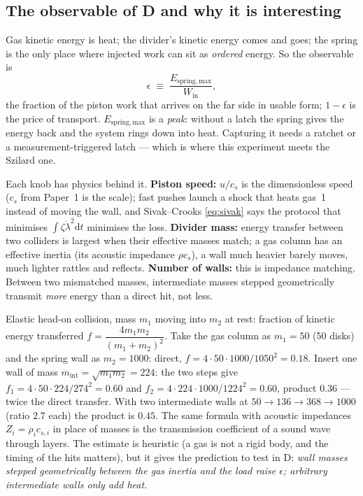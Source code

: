 \documentclass[11pt,a4paper]{article}
\newcommand{\dd}{\mathrm{d}}
\begin{document}
\subsection{The observable of D and why it is interesting}
Gas kinetic energy is heat; the divider's kinetic energy comes and goes; the spring is the only place where injected work can sit as \emph{ordered} energy. So the observable is
\begin{equation}
\epsilon \;\equiv\; \frac{E_{\mathrm{spring,max}}}{W_{\mathrm{in}}},
\end{equation}
the fraction of the piston work that arrives on the far side in usable form; $1-\epsilon$ is the price of transport. $E_{\mathrm{spring,max}}$ is a \emph{peak}: without a latch the spring gives the energy back and the system rings down into heat. Capturing it needs a ratchet or a measurement-triggered latch --- which is where this experiment meets the Szilard one.

Each knob has physics behind it. \textbf{Piston speed:} $u/c_s$ is the dimensionless speed ($c_s$ from Paper~1 is the scale); fast pushes launch a shock that heats gas~1 instead of moving the wall, and Sivak--Crooks \eqref{eq:sivak} says the protocol that minimises $\int\zeta\dot\lambda^2\dd t$ minimises the loss. \textbf{Divider mass:} energy transfer between two colliders is largest when their effective masses match; a gas column has an effective inertia (its acoustic impedance $\rho c_s$), a wall much heavier barely moves, much lighter rattles and reflects. \textbf{Number of walls:} this is impedance matching. Between two mismatched masses, intermediate masses stepped geometrically transmit \emph{more} energy than a direct hit, not less.

\begin{worked}
Elastic head-on collision, mass $m_1$ moving into $m_2$ at rest: fraction of kinetic energy transferred $f = \dfrac{4m_1m_2}{(m_1+m_2)^2}$. Take the gas column as $m_1 = 50$ (50 disks) and the spring wall as $m_2 = 1000$: direct, $f = 4\cdot50\cdot1000/1050^2 = 0.18$. Insert one wall of mass $m_{\mathrm{int}} = \sqrt{m_1m_2} = 224$: the two steps give $f_1 = 4\cdot50\cdot224/274^2 = 0.60$ and $f_2 = 4\cdot224\cdot1000/1224^2 = 0.60$, product $0.36$ --- twice the direct transfer. With two intermediate walls at $50\to136\to368\to1000$ (ratio $2.7$ each) the product is $0.45$. The same formula with acoustic impedances $Z_i = \rho_i c_{s,i}$ in place of masses is the transmission coefficient of a sound wave through layers. The estimate is heuristic (a gas is not a rigid body, and the timing of the hits matters), but it gives the prediction to test in D: \emph{wall masses stepped geometrically between the gas inertia and the load raise $\epsilon$; arbitrary intermediate walls only add heat.}
\end{worked}
\end{document}
